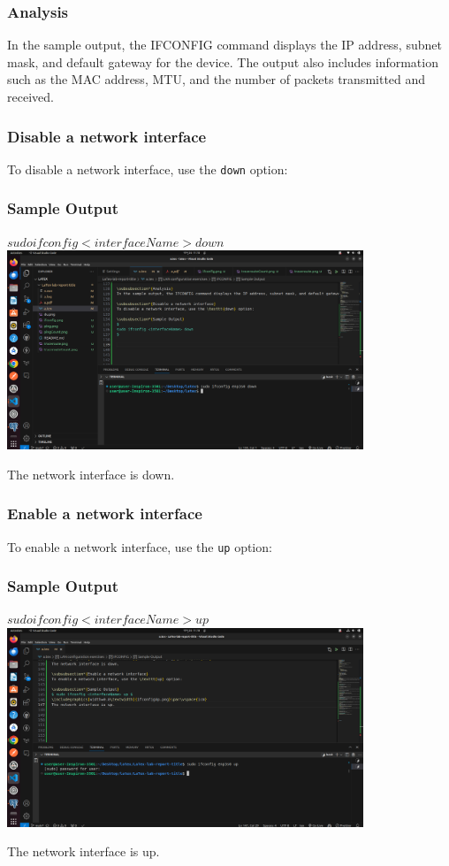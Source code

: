 \documentclass[12pt]{article}
\begin{document}
\subsubsection*{Analysis}
In the sample output, the IFCONFIG command displays the IP address, subnet mask, and default gateway for the device. The output also includes information such as the MAC address, MTU, and the number of packets transmitted and received.

\subsubsection*{Disable a network interface}
To disable a network interface, use the \texttt{down} option:

\subsubsection*{Sample Output}
$
sudo ifconfig <interfaceName> down
$
\includegraphics[width=0.8\textwidth]{ifconfigDown.png}\par\vspace{1cm}
The network interface is down.

\subsubsection*{Enable a network interface}
To enable a network interface, use the \texttt{up} option:

\subsubsection*{Sample Output}
$ sudo ifconfig <interfaceName> up $
\includegraphics[width=0.8\textwidth]{ifconfigUp.png}\par\vspace{1cm}
The network interface is up.
\end{document}
